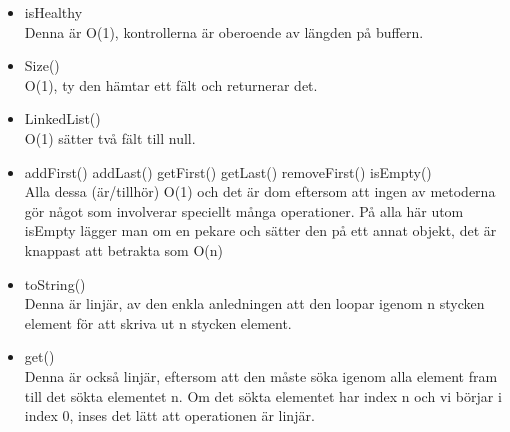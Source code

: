 \documentclass[a4paper,11pt]{article}
\begin{document}
\begin{itemize}
\item isHealthy \\
Denna är O(1), kontrollerna är oberoende av längden på buffern.\\
\item Size() \\
O(1), ty den hämtar ett fält och returnerar det.\\
\item LinkedList() \\
O(1) sätter två fält till null.\\
\item addFirst() addLast() getFirst() getLast() removeFirst() isEmpty() \\
Alla dessa (är/tillhör) O(1) och det är dom eftersom att ingen av metoderna gör något som involverar speciellt många operationer. På alla här utom isEmpty lägger man om en pekare och sätter den på ett annat objekt, det är knappast att betrakta som O(n) \\
\item toString() \\
Denna är linjär, av den enkla anledningen att den loopar igenom n stycken element för att skriva ut n stycken element.\\
\item get() \\
Denna är också linjär, eftersom att den måste söka igenom alla element fram till det sökta elementet n. Om det sökta elementet har index n och vi börjar i index 0, inses det lätt att operationen är linjär.
\end{itemize}
\end{document}

